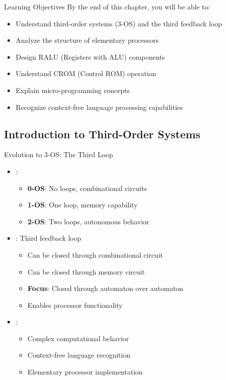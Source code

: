 \begin{frame}{Learning Objectives}
By the end of this chapter, you will be able to:
\begin{itemize}
\item Understand third-order systems (3-OS) and the third feedback loop
\item Analyze the structure of elementary processors
\item Design RALU (Registers with ALU) components
\item Understand CROM (Control ROM) operation
\item Explain micro-programming concepts
\item Recognize context-free language processing capabilities
\end{itemize}
\end{frame}

\subsection{Introduction to Third-Order Systems}

\begin{frame}{Evolution to 3-OS: The Third Loop}
\begin{itemize}
\item {}:
\begin{itemize}
\item \textbf{0-OS}: No loops, combinational circuits
\item \textbf{1-OS}: One loop, memory capability
\item \textbf{2-OS}: Two loops, autonomous behavior
\end{itemize}
\vspace{0.5cm}
\item {}: Third feedback loop
\begin{itemize}
\item Can be closed through combinational circuit
\item Can be closed through memory circuit
\item \textbf{Focus}: Closed through automaton over automaton
\item Enables processor functionality
\end{itemize}
\vspace{0.3cm}
\item {}:
\begin{itemize}
\item Complex computational behavior
\item Context-free language recognition
\item Elementary processor implementation
\end{itemize}
\end{itemize}
\end{frame}

